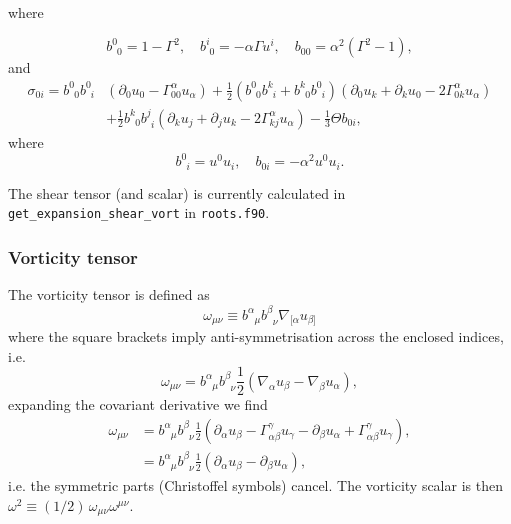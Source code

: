 \documentclass[a4paper]{article}
\newcommand{\ph}{\phantom}
\newcommand{\alp}{\alpha}
\newcommand{\Gam}{\Gamma}
\newcommand{\pd}{\partial}
\begin{document}
where

\begin{equation}
	b^0_{\ph{0}0} = 1 - \Gam^2, \quad b^i_{\ph{i}0} = - \alp \Gam u^i, \quad b_{00} = \alp^2 \left( \Gam^2 - 1 \right),
\end{equation}
and
\begin{equation}
	\begin{aligned}
		\sigma_{0i} = b^0_{\ph{0}0} b^0_{\ph{0}i} &\left( \pd_0 u_0 - \Gam^\alp_{00} u_\alp \right) +  \frac{1}{2} \left( b^0_{\ph{0}0} b^k_{\ph{0}i} + b^k_{\ph{k}0} b^0_{\ph{0}i} \right) \left( \pd_0 u_k + \pd_k u_0 - 2 \Gam^\alp_{0k} u_\alp \right) \\
		&+ \frac{1}{2} b^k_{\ph{k}0} b^j_{\ph{j}i} \left( \pd_k u_j + \pd_j u_k - 2 \Gam^\alp_{kj} u_\alp \right) - \frac{1}{3}\Theta b_{0i},
	\end{aligned}
\end{equation}
where
\begin{equation}
	b^0_{\ph{0}i} = u^0 u_i, \quad b_{0i} = - \alp^2 u^0 u_i.
\end{equation}

The shear tensor (and scalar) is currently calculated in \texttt{get\_expansion\_shear\_vort} in \texttt{roots.f90}.


\subsubsection{Vorticity tensor}

The vorticity tensor is defined as
\begin{equation}
	\omega_{\mu\nu} \equiv b^\alpha_{\ph{\alpha}\mu} b^\beta_{\ph{\beta}\nu} \nabla_{[\alpha} u_{\beta]}
\end{equation}
where the square brackets imply anti-symmetrisation across the enclosed indices, i.e.
\begin{equation}
	\omega_{\mu\nu} = b^\alpha_{\ph{\alpha}\mu} b^\beta_{\ph{\beta}\nu} \frac{1}{2} \left( \nabla_\alpha u_\beta - \nabla_\beta u_\alpha \right),
\end{equation}
expanding the covariant derivative we find
\begin{align}
	\omega_{\mu\nu} &= b^\alpha_{\ph{\alpha}\mu} b^\beta_{\ph{\beta}\nu} \frac{1}{2} \left( \pd_\alpha u_\beta - \Gamma^\gamma_{\alpha\beta} u_\gamma - \pd_\beta u_\alpha + \Gamma^\gamma_{\alpha\beta} u_\gamma \right), \\
				&= b^\alpha_{\ph{\alpha}\mu} b^\beta_{\ph{\beta}\nu} \frac{1}{2} \left( \pd_\alpha u_\beta - \pd_\beta u_\alpha \right),
\end{align}
i.e. the symmetric parts (Christoffel symbols) cancel. The vorticity scalar is then $\omega^2 \equiv (1/2)\, \omega_{\mu\nu} \omega^{\mu\nu}$.
\end{document}
